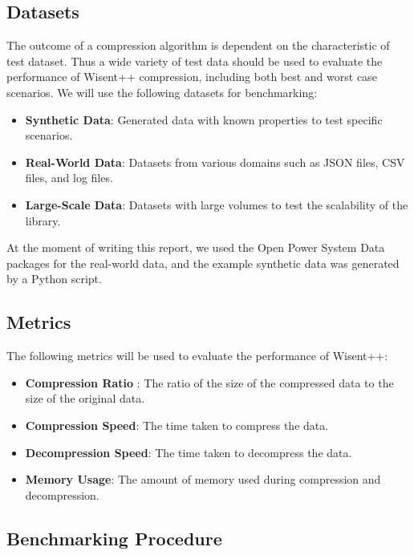 \subsection{Datasets}

The outcome of a compression algorithm is dependent on the characteristic of test dataset. Thus a wide variety of test data should be used to evaluate the performance of Wisent++ compression, including both best and worst case scenarios. We will use the following datasets for benchmarking:

\begin{itemize}
   \item \textbf{Synthetic Data}: Generated data with known properties to test specific scenarios.
   \item \textbf{Real-World Data}: Datasets from various domains such as JSON files, CSV files, and log files.
   \item \textbf{Large-Scale Data}: Datasets with large volumes to test the scalability of the library.
\end{itemize}

At the moment of writing this report, we used the Open Power System Data packages \cite{open_power_system_data} for the real-world data, and the example synthetic data was generated by a Python script. 

\subsection{Metrics}

The following metrics will be used to evaluate the performance of Wisent++:

\begin{itemize}
   \item \textbf{Compression Ratio} \cite{wikipedia_compression_ratio}: The ratio of the size of the compressed data to the size of the original data. 
   \item \textbf{Compression Speed}: The time taken to compress the data.
   \item \textbf{Decompression Speed}: The time taken to decompress the data.
   \item \textbf{Memory Usage}: The amount of memory used during compression and decompression.
\end{itemize}

\subsection{Benchmarking Procedure}

